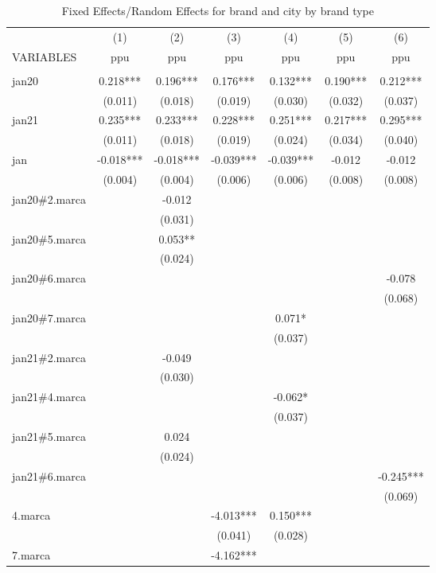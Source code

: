 \begin{longtable}{lcccccc} 
	\caption{Fixed Effects/Random Effects for brand and city by brand type}\label{tab:xt2}\\	
	\hline
 & (1) & (2) & (3) & (4) & (5) & (6) \\
VARIABLES & ppu & ppu & ppu & ppu & ppu & ppu \\ \hline
 &  &  &  &  &  &  \\
jan20 & 0.218*** & 0.196*** & 0.176*** & 0.132*** & 0.190*** & 0.212*** \\
& (0.011) & (0.018) & (0.019) & (0.030) & (0.032) & (0.037) \\
jan21 & 0.235*** & 0.233*** & 0.228*** & 0.251*** & 0.217*** & 0.295*** \\
& (0.011) & (0.018) & (0.019) & (0.024) & (0.034) & (0.040) \\
jan & -0.018*** & -0.018*** & -0.039*** & -0.039*** & -0.012 & -0.012 \\
& (0.004) & (0.004) & (0.006) & (0.006) & (0.008) & (0.008) \\
jan20\#2.marca &  & -0.012 &  &  &  &  \\
&  & (0.031) &  &  &  &  \\
jan20\#5.marca &  & 0.053** &  &  &  &  \\
&  & (0.024) &  &  &  &  \\
jan20\#6.marca &  &  &  &  &  & -0.078 \\
&  &  &  &  &  & (0.068) \\
jan20\#7.marca &  &  &  & 0.071* &  &  \\
 &  &  &  & (0.037) &  &  \\
jan21\#2.marca &  & -0.049 &  &  &  &  \\
&  & (0.030) &  &  &  &  \\
jan21\#4.marca &  &  &  & -0.062* &  &  \\
 &  &  &  & (0.037) &  &  \\
jan21\#5.marca &  & 0.024 &  &  &  &  \\
 &  & (0.024) &  &  &  &  \\
jan21\#6.marca &  &  &  &  &  & -0.245*** \\
&  &  &  &  &  & (0.069) \\
4.marca &  &  & -4.013*** & 0.150*** &  &  \\
&  &  & (0.041) & (0.028) &  &  \\
7.marca &  &  & -4.162*** &  &  &  \\

\end{longtable}
